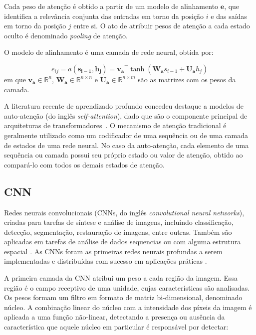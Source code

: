 Cada peso de atenção é obtido a partir de um modelo de alinhamento $\mathbf{e}$,
que identifica a relevância conjunta das entradas em torno da posição $i$ e das
saídas em torno da posição $j$ entre si. O ato de atribuir pesos de atenção a
cada estado oculto é denominado \textit{pooling} de atenção.

O modelo de alinhamento é uma camada de
rede neural, obtida por:

\begin{equation}
    e_{ij} = a(\mathbf{s_{i-1}}, \mathbf{h_j}) = \mathbf{v_a}^\top \tanh(\mathbf{W_a}s_{i-1} + \mathbf{U_a}h_j)
\end{equation}
em que $\mathbf{v_a} \in \mathbb{R}^n$, $\mathbf{W_a} \in \mathbb{R}^{n \times
n}$ e $\mathbf{U_a} \in \mathbb{R}^{n \times m}$ são as matrizes com os pesos da
camada.

A literatura recente de aprendizado profundo concedeu destaque a modelos de
auto-atenção (do inglês \textit{self-attention}), dado que são o componente
principal de arquiteturas de transformadores~\cite{kim2017structured}. O
mecanismo de atenção tradicional é geralmente utilizado como um codificador de
uma sequência ou de uma camada de estados de uma rede neural. No caso da
auto-atenção, cada elemento de uma sequência ou camada possui seu próprio
estado ou valor de atenção, obtido ao compará-lo com todos os demais estados
de atenção.

\subsection{CNN}
Redes neurais convolucionais (CNNs, do inglês \textit{convolutional neural
networks}), criadas para tarefas de síntese e análise de imagens, incluindo
classificação, detecção, segmentação, restauração de imagens, entre outras.
Também são aplicadas em tarefas de análise de dados sequencias ou com alguma
estrutura espacial \cite{Bishop:DeepLearning24}. As CNNs foram as primeiras
redes neurais profundas a serem implementadas e distribuídas com sucesso em
aplicações práticas \cite{lecun1989}.

A primeira camada da CNN atribui um peso a cada região da imagem. Essa região é
o campo receptivo de uma unidade, cujas características são analisadas.
Os pesos formam um filtro em formato de matriz bi-dimensional, denominado
núcleo. A combinação linear do núcleo com a intensidade dos píxeis da imagem é
aplicada a uma função não-linear, detectando a presença ou ausência da
característica que aquele núcleo em particular é responsável por detectar:

